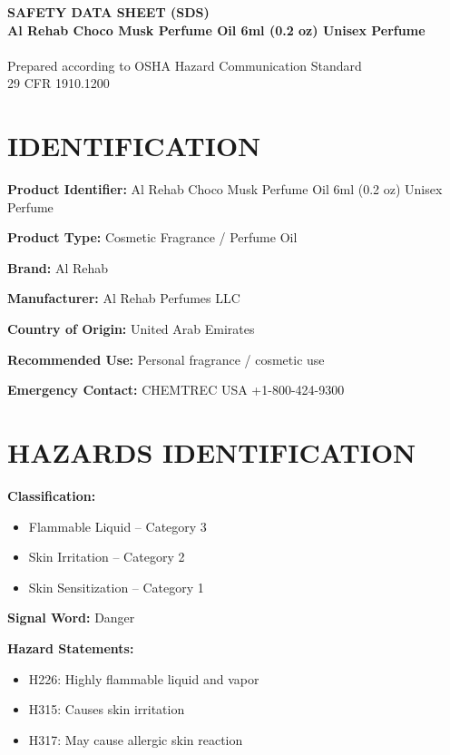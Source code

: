 \documentclass[11pt]{article}
\begin{document}
\begin{center}
{\LARGE \textbf{SAFETY DATA SHEET (SDS)}}\\[6pt]
{\Large \textbf{Al Rehab Choco Musk Perfume Oil 6ml (0.2 oz) Unisex Perfume}}\\
{\large \textbf{}}\\[6pt]
Prepared according to OSHA Hazard Communication Standard\\
29 CFR 1910.1200
\end{center}

\vspace{10pt}

\section{IDENTIFICATION}

\textbf{Product Identifier:} Al Rehab Choco Musk Perfume Oil 6ml (0.2 oz) Unisex Perfume

\textbf{Product Type:} Cosmetic Fragrance / Perfume Oil

\textbf{Brand:} Al Rehab

\textbf{Manufacturer:} Al Rehab Perfumes LLC

\textbf{Country of Origin:} United Arab Emirates

\textbf{Recommended Use:} Personal fragrance / cosmetic use

\textbf{Emergency Contact:} CHEMTREC USA +1-800-424-9300

\section{HAZARDS IDENTIFICATION}

\textbf{Classification:}
\begin{itemize}[noitemsep]
    \item Flammable Liquid -- Category 3
    \item Skin Irritation -- Category 2
    \item Skin Sensitization -- Category 1
\end{itemize}

\textbf{Signal Word:} Danger

\textbf{Hazard Statements:}
\begin{itemize}[noitemsep]
    \item H226: Highly flammable liquid and vapor
    \item H315: Causes skin irritation
    \item H317: May cause allergic skin reaction
\end{itemize}
\end{document}

